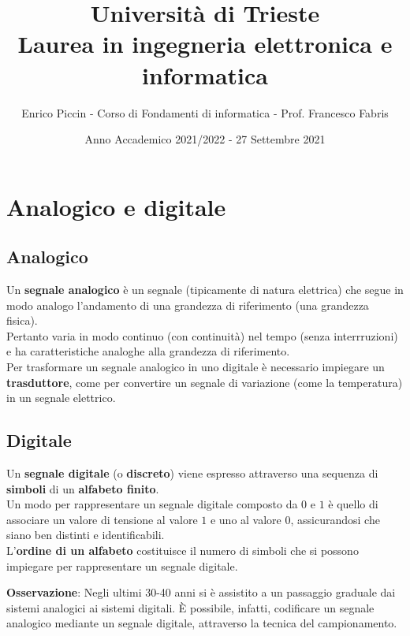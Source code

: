 \documentclass[a4paper]{extarticle}
\title{\textbf{Università di Trieste\\ \vspace{1em}
Laurea in ingegneria elettronica e informatica}}
\author{Enrico Piccin - Corso di Fondamenti di informatica - Prof. Francesco Fabris}
\date{Anno Accademico 2021/2022 - 27 Settembre 2021}
\begin{document}
\vspace{-10mm}
\maketitle

\tableofcontents
\newpage

\section{Analogico e digitale}

\subsection{Analogico}
Un \textbf{segnale analogico} è un segnale (tipicamente di natura elettrica) che segue in modo analogo l'andamento di una grandezza di riferimento (una grandezza fisica).\\ Pertanto varia in modo continuo (con continuità) nel tempo (senza interrruzioni) e ha caratteristiche analoghe alla grandezza di riferimento.\\
Per trasformare un segnale analogico in uno digitale è necessario impiegare un \textbf{trasduttore}, come per convertire un segnale di variazione (come la temperatura) in un segnale elettrico.

\subsection{Digitale}
Un \textbf{segnale digitale} (o \textbf{discreto}) viene espresso attraverso una sequenza di \textbf{simboli} di un \textbf{alfabeto finito}.\\
Un modo per rappresentare un segnale digitale composto da \(0\) e \(1\) è quello di associare un valore di tensione al valore \(1\) e uno al valore \(0\), assicurandosi che siano ben distinti e identificabili.\\
L'\textbf{ordine di un alfabeto} costituisce il numero di simboli che si possono impiegare per rappresentare un segnale digitale.

\vspace{1em}
\noindent
\textbf{Osservazione}: Negli ultimi 30-40 anni si è assistito a un passaggio
graduale dai sistemi analogici ai sistemi digitali. È possibile, infatti, codificare un segnale analogico mediante un segnale digitale, attraverso la tecnica del campionamento.
\end{document}
